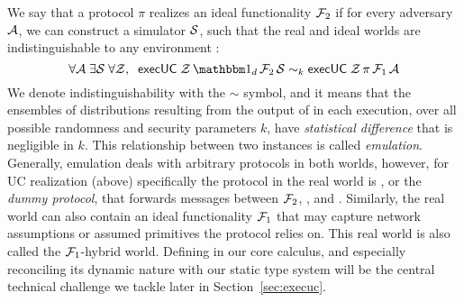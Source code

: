 We say that a protocol $\pi$ realizes an ideal functionality $\mathcal{F}_2$
if for every adversary $\mathcal{A}$, we can construct a simulator $\mathcal{S}$, such that the real and ideal worlds are indistinguishable to any environment \Z:
\begin{equation}
  \label{eqn:emulation}
  \forall \A \; \exists \Sim \; \forall \Z, \; \; \msf{execUC} \; \Z \, \idealP \, \F_2 \, \Sim \sim_k \msf{execUC} \; \Z \, \pi \, \F_1 \, \A
\end{equation}
We denote indistinguishability with the $\sim$ symbol, and it means that the ensembles of distributions resulting from the output of \Z
in each execution, over all possible randomness and security parameters $k$, have \emph{statistical difference} that is negligible in $k$.
This relationship between two  instances is called \emph{emulation}. 
Generally, emulation deals with arbitrary protocols in both worlds, however, for UC realization (above) specifically the protocol in the
real world is \idealP, or the \emph{dummy protocol}, that forwards messages between $\mathcal{F}_2$, \Z,  and \A. 
Similarly, the real world can also contain an ideal functionality $\mathcal{F}_1$ that may capture network assumptions or assumed primitives the protocol relies on. 
This real world is also called the $\mathcal{F}_1$-hybrid world.
Defining  in our core calculus, and especially reconciling its dynamic nature with our static type system will be the central technical challenge
we tackle later in Section~\ref{sec:execuc}.

